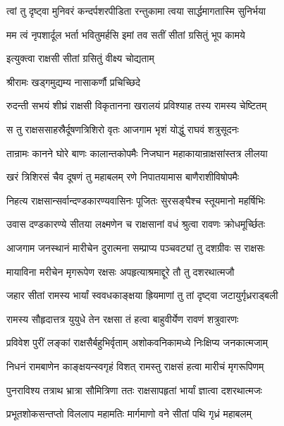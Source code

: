 \twolineshloka
{त्वां तु दृष्ट्वा मुनिवरं कन्दर्पशरपीडिता}
{रन्तुकामा त्वया सार्द्धमागतास्मि सुनिर्भया}%

\twolineshloka
{मम त्वं नृपशार्दूल भर्ता भवितुमर्हसि}
{इमां तव सतीं सीतां ग्रसितुं भूप कामये}%



\onelineshloka
{इत्युक्त्वा राक्षसी सीतां ग्रसितुं वीक्ष्य चोद्यताम्}%

\onelineshloka
{श्रीरामः खड्गमुद्यम्य नासाकर्णौ प्रचिच्छिदे}%

\twolineshloka
{रुदन्ती सभयं शीघ्रं राक्षसी विकृतानना}
{खरालयं प्रविश्याह तस्य रामस्य चेष्टितम्}%

\twolineshloka
{स तु राक्षससाहस्रैर्दूषणत्रिशिरो वृतः}
{आजगाम भृशं योद्धुं राघवं शत्रुसूदनः}%

\twolineshloka
{तान्रामः कानने घोरे बाणः कालान्तकोपमैः}
{निजघान महाकायान्राक्षसांस्तत्र लीलया}%

\twolineshloka
{खरं त्रिशिरसं चैव दूषणं तु महाबलम्}
{रणे निपातयामास बाणैराशीविषोपमैः}%

\twolineshloka
{निहत्य राक्षसान्सर्वान्दण्डकारण्यवासिनः}
{पूजितः सुरसङ्घैश्च स्तूयमानो महर्षिभिः}%

\twolineshloka
{उवास दण्डकारण्ये सीतया लक्ष्मणेन च}
{राक्षसानां वधं श्रुत्वा रावणः क्रोधमूर्च्छितः}%

\twolineshloka
{आजगाम जनस्थानं मारीचेन दुरात्मना}
{सम्प्राप्य पञ्चवट्यां तु दशग्रीवः स राक्षसः}%

\twolineshloka
{मायाविना मरीचेन मृगरूपेण रक्षसः}
{अपहृत्याश्रमाद्दूरे तौ तु दशरथात्मजौ}%

\twolineshloka
{जहार सीतां रामस्य भार्यां स्ववधकाङ्क्षया}
{ह्रियमाणां तु तां दृष्ट्वा जटायुर्गृध्रराड्बली}%

\twolineshloka
{रामस्य सौहृदात्तत्र युयुधे तेन रक्षसा}
{तं हत्वा बाहुवीर्येण रावणं शत्रुवारणः}%

\twolineshloka
{प्रविवेश पुरीं लङ्कां राक्षसैर्बहुभिर्वृताम्}
{अशोकवनिकामध्ये निःक्षिप्य जनकात्मजाम्}%

\twolineshloka
{निधनं रामबाणेन काङ्क्षयन्स्वगृहं विशत्}
{रामस्तु राक्षसं हत्वा मारीचं मृगरूपिणम्}%

\twolineshloka
{पुनराविश्य तत्राथ भ्रात्रा सौमित्रिणा ततः}
{राक्षसापहृतां भार्यां ज्ञात्वा दशरथात्मजः}%

\twolineshloka
{प्रभूतशोकसन्तप्तो विललाप महामतिः}
{मार्गमाणो वने सीतां पथि गृध्रं महाबलम्}%

